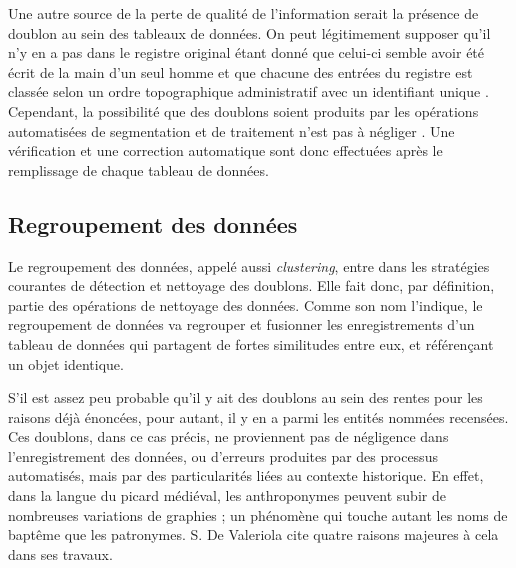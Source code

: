 Une autre source de la perte de qualité de l'information serait la présence de doublon au sein des tableaux de données. On peut légitimement supposer qu'il n'y en a pas dans le registre original étant donné que celui-ci semble avoir été écrit de la main d'un seul homme  et que chacune des entrées du registre est classée selon un ordre topographique administratif avec un identifiant unique \parencite{espinas_les_1933}. Cependant, la possibilité que des doublons soient produits par les opérations automatisées de segmentation et de traitement n’est pas à négliger \parencite{koudoro-parfait_reconnaissance_2022}. Une vérification et une correction automatique sont donc effectuées après le remplissage de chaque tableau de données.

\subsection{Regroupement des données}
Le regroupement des données, appelé aussi \textit{clustering}, entre dans les stratégies courantes de détection et nettoyage des doublons. Elle fait donc, par définition, partie des opérations de nettoyage des données. Comme son nom l'indique, le regroupement de données va regrouper et fusionner les enregistrements d'un tableau de données qui partagent de fortes similitudes entre eux, et référençant un objet identique. 

S'il est assez peu probable qu'il y ait des doublons au sein des rentes pour les raisons déjà énoncées, pour autant, il y en a parmi les entités nommées recensées. Ces doublons, dans ce cas précis, ne proviennent pas de négligence dans l'enregistrement des données, ou d'erreurs  produites par des processus automatisés, mais par des particularités liées au contexte historique.
En effet, dans la langue du picard médiéval, les anthroponymes peuvent subir de nombreuses variations de graphies ; un phénomène qui touche autant les noms de baptême que les patronymes. S. De Valeriola cite quatre raisons majeures à cela dans ses travaux.

